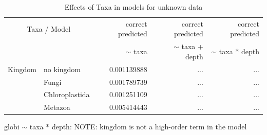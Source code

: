 \begin{table}[h!]
\begin{center}
\begin{longtable}{ |l|l|r|r|r| }
          \hline \hline
          \multicolumn{2}{|c|}{Taxa / Model} & correct predicted & correct predicted & correct predicted \\
          \multicolumn{2}{|c|}{} & $\sim$ taxa & $\sim$ taxa + depth & $\sim$ taxa * depth \\
          \hline \hline
          Kingdom & no kingdom  & 0.001139888 & ... & ... \\
          & Fungi               & 0.001789739 & ... & ... \\
          & Chloroplastida      & 0.001251109 & ... & ... \\
          & Metazoa             & 0.005414443 & ... & ... \\
          \hline
        \end{longtable} 
      \end{center}
      \caption{Effects of Taxa in models for unknown data}
      \label{table:Effects unknown data} 
    \end{table}

    globi $\sim$ taxa * depth: NOTE: kingdom is not a high-order term in the model

